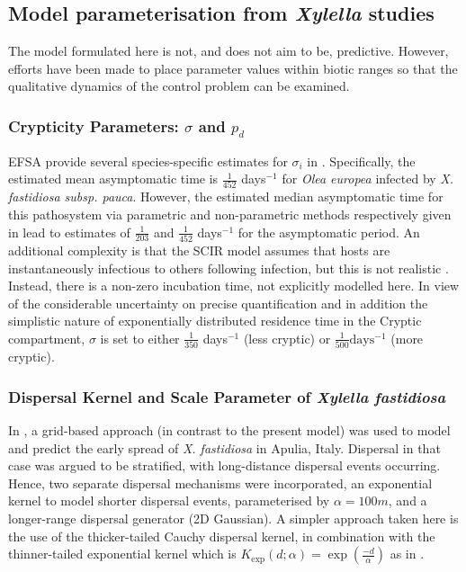 \documentclass[11pt,letterpaper]{article}
\begin{document}
\FloatBarrier
\subsection*{Model parameterisation from \emph{Xylella} studies}

The model formulated here is not, and does not aim to be, predictive. However, efforts have been made to place parameter values within biotic ranges so that the qualitative dynamics of the control problem can be examined. 

\subsubsection*{Crypticity Parameters: $\sigma$ and  $p_{d}$}

  EFSA provide several species-specific estimates for $\sigma_{i}$ in \cite{Bragard2019}. Specifically, the estimated mean asymptomatic time is $\frac{1}{452}$ days$^{-1}$ for \emph{Olea europea} infected by \emph{X. fastidiosa subsp. pauca}. However, the estimated median asymptomatic time for this pathosystem via parametric and non-parametric methods respectively given in \cite{Bragard2019} lead to estimates of $\frac{1}{203}$ and $\frac{1}{452}$ days$^{-1}$ for the asymptomatic period. An additional complexity is that the SCIR model assumes that hosts are instantaneously infectious to others following infection, but this is not realistic \cite{Leclerc2014}. Instead, there is a non-zero incubation time, not explicitly modelled here. In view of the considerable uncertainty on precise quantification and in addition the simplistic nature of exponentially distributed residence time in the Cryptic compartment, $\sigma$ is set to either $\frac{1}{350}$  days$^{-1}$ (less cryptic) or $\frac{1}{500} \mathrm{days^{-1}}$ (more cryptic).
\FloatBarrier
\subsubsection*{Dispersal Kernel and Scale Parameter of \emph{Xylella fastidiosa}}

In \cite{White2017}, a grid-based approach (in contrast to the present model) was used to model and predict the early spread of \emph{X. fastidiosa} in Apulia, Italy. Dispersal in that case was argued to be stratified, with long-distance dispersal events occurring. Hence, two separate dispersal mechanisms were incorporated, an exponential kernel to model shorter dispersal events, parameterised by $\alpha = 100 m$, and a longer-range dispersal generator (2D Gaussian). A simpler approach taken here is the use of the thicker-tailed Cauchy dispersal kernel, in combination with the thinner-tailed exponential kernel which is $K_{\exp}(d; \alpha) = \exp\left(\frac{-d}{\alpha}\right)$ as in \cite{HyattTwynam2017}. 
\end{document}
